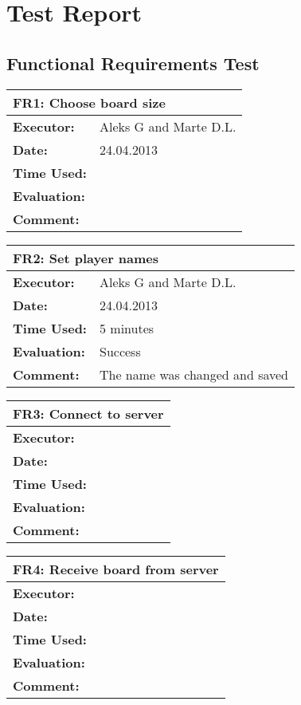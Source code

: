 \section{Test Report}
\label{testreport}

\subsection{Functional Requirements Test}

\begin{tabular}{|m{}||m{}|}
\hline
\multicolumn{2}{|l|}{FR1: Choose board size} \\ \hline
\textbf{Executor:} & Aleks G and Marte D.L.\\ \hline
\textbf{Date:} & 24.04.2013\\ \hline
\textbf{Time Used:} & \\ \hline
\textbf{Evaluation:} & \\ \hline
\textbf{Comment:} & \\ \hline
\end{tabular}

\begin{tabular}{|m{}||m{}|}
\hline
\multicolumn{2}{|l|}{FR2: Set player names} \\ \hline
\textbf{Executor:} & Aleks G and Marte D.L.\\ \hline
\textbf{Date:} & 24.04.2013\\ \hline
\textbf{Time Used:} & 5 minutes\\ \hline
\textbf{Evaluation:} & Success\\ \hline
\textbf{Comment:} & The name was changed and saved\\ \hline
\end{tabular}

\begin{tabular}{|m{}||m{}|}
\hline
\multicolumn{2}{|l|}{FR3: Connect to server} \\ \hline
\textbf{Executor:} & \\ \hline
\textbf{Date:} & \\ \hline
\textbf{Time Used:} & \\ \hline
\textbf{Evaluation:} & \\ \hline
\textbf{Comment:} & \\ \hline
\end{tabular}

\begin{tabular}{|m{}||m{}|}
\hline
\multicolumn{2}{|l|}{FR4: Receive board from server} \\ \hline
\textbf{Executor:} & \\ \hline
\textbf{Date:} & \\ \hline
\textbf{Time Used:} & \\ \hline
\textbf{Evaluation:} & \\ \hline
\textbf{Comment:} & \\ \hline
\end{tabular}

